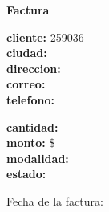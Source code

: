 \documentclass{article}
\begin{document}
\begin{center}
    {\LARGE \textbf{Factura}}\\[1cm]
\end{center}

\textbf{cliente:} 259036 \\
\textbf{ciudad:}  \\
\textbf{direccion:}  \\
\textbf{correo:}  \\
\textbf{telefono:}  \\

\vspace{0.5cm}

\textbf{cantidad:}  \\
\textbf{monto:} \$ \\
\textbf{modalidad:}  \\
\textbf{estado:}  \\

\vspace{1cm}

Fecha de la factura: 
\end{document}

